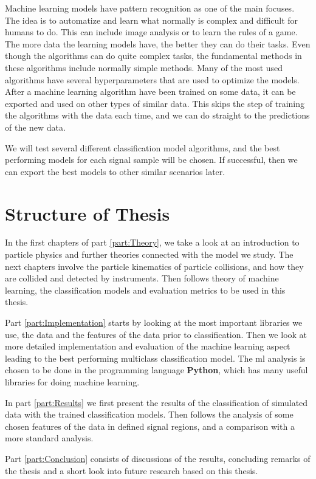 \documentclass[a4paper, american, 12pt]{report}
\begin{document}
	Machine learning models have pattern recognition as one of the main focuses. The idea is to automatize and learn what normally is complex and difficult for humans to do. This can include image analysis or to learn the rules of a game. The more data the learning models have, the better they can do their tasks. Even though the algorithms can do quite complex tasks, the fundamental methods in these algorithms include normally simple methods. Many of the most used algorithms have several hyperparameters that are used to optimize the models. After a machine learning algorithm have been trained on some data, it can be exported and used on other types of similar data. This skips the step of training the algorithms with the data each time, and we can do straight to the predictions of the new data. 
	
	We will test several different classification model algorithms, and the best performing models for each signal sample will be chosen. If successful, then we can export the best models to other similar scenarios later. 
	

	\section{Structure of Thesis}
	\label{sect:Intro-Structure}
	In the first chapters of part \ref{part:Theory}, we take a look at an introduction to particle physics and further theories connected with the model we study. The next chapters involve the particle kinematics of particle collisions, and how they are collided and detected by instruments. Then follows theory of machine learning, the classification models and evaluation metrics to be used in this thesis.
	
	Part \ref{part:Implementation} starts by looking at the most important libraries we use, the data and the features of the data prior to classification. Then we look at more detailed implementation and evaluation of the machine learning aspect leading to the best performing multiclass classification model. The \acrshort{ml} analysis is chosen to be done in the programming language \textbf{Python}, which has many useful libraries for doing machine learning.
	
	In part \ref{part:Results} we first present the results of the classification of simulated data with the trained classification models. Then follows the analysis of some chosen features of the data in defined signal regions, and a comparison with a more standard analysis.
	
	Part \ref{part:Conclusion} consists of discussions of the results, concluding remarks of the thesis and a short look into future research based on this thesis.
	
\end{document}
